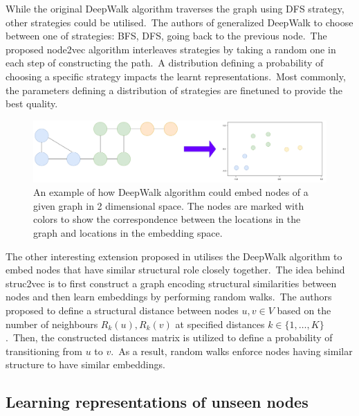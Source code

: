 \documentclass[longabstract, english, mgr]{iithesis}
\theoremstyle{default_theorem_style}\newtheorem{theorem}{Theorem}
\theoremstyle{default_theorem_style}\newtheorem{definition}{Definition}
\begin{document}
\noindent While the original DeepWalk algorithm traverses the graph using DFS strategy, other strategies could
be utilised.\ The authors of \cite{node2vec} generalized DeepWalk to choose between one of strategies: BFS, DFS,
going back to the previous node.\ The proposed node2vec algorithm interleaves strategies by taking a random one in
each step of constructing the path.\ A distribution defining a probability of choosing a specific strategy impacts the
learnt representations.\ Most commonly, the parameters defining a distribution of strategies are finetuned to provide
the best quality.\newline

\begin{figure}[t]
\centering
\includegraphics[scale=0.23]{deepwalk}
\caption{An example of how DeepWalk algorithm could embed nodes of a given graph in 2 dimensional space. The nodes
are marked with colors to show the correspondence between the locations in the graph and locations in the embedding
space.}
\label{fig:deepwalk}
\end{figure}

\noindent The other interesting extension proposed in \cite{struc2vec} utilises the DeepWalk algorithm to embed
nodes that have similar structural role closely together.\ The idea behind struc2vec is to first construct a
graph encoding structural similarities between nodes and then learn embeddings by performing random walks.\ The authors
proposed to define a structural distance between nodes $u, v \in V$ based on the number of neighbours
$R_k(u), R_k(v)$ at specified distances $k \in \{1, \dots, K\}$.\ Then, the constructed distances matrix is utilized
to define a probability of transitioning from $u$ to $v$.\ As a result, random walks enforce nodes having similar
structure to have similar embeddings.

\subsection{Learning representations of unseen nodes}
\end{document}
